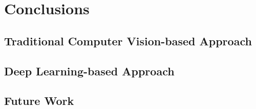 \chapter{Conclusions}

\section{Traditional Computer Vision-based Approach}

\section{Deep Learning-based Approach}

\section{Future Work}
\label{chpt:conclusion}